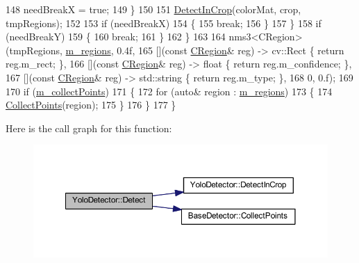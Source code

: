 \begin{DoxyCode}
148                 needBreakX = \textcolor{keyword}{true};
149             \}
150 
151             \mbox{\hyperlink{class_yolo_detector_ad3ca3f52cee36d143b015a3f5f99ebf6}{DetectInCrop}}(colorMat, crop, tmpRegions);
152 
153             \textcolor{keywordflow}{if} (needBreakX)
154             \{
155                 \textcolor{keywordflow}{break};
156             \}
157         \}
158         \textcolor{keywordflow}{if} (needBreakY)
159         \{
160             \textcolor{keywordflow}{break};
161         \}
162     \}
163 
164     nms3<CRegion>(tmpRegions, \mbox{\hyperlink{class_base_detector_a409c20093acba261db8354ca72058fce}{m\_regions}}, 0.4f,
165          [](\textcolor{keyword}{const} \mbox{\hyperlink{class_c_region}{CRegion}}& reg) -> cv::Rect \{ \textcolor{keywordflow}{return} reg.m\_rect; \},
166     [](\textcolor{keyword}{const} \mbox{\hyperlink{class_c_region}{CRegion}}& reg) -> \textcolor{keywordtype}{float} \{ \textcolor{keywordflow}{return} reg.m\_confidence; \},
167     [](\textcolor{keyword}{const} \mbox{\hyperlink{class_c_region}{CRegion}}& reg) -> std::string \{ \textcolor{keywordflow}{return} reg.m\_type; \},
168     0, 0.f);
169 
170     \textcolor{keywordflow}{if} (\mbox{\hyperlink{class_base_detector_a403cbf784fcb960bdb7d080c86c4a2ea}{m\_collectPoints}})
171     \{
172         \textcolor{keywordflow}{for} (\textcolor{keyword}{auto}& region : \mbox{\hyperlink{class_base_detector_a409c20093acba261db8354ca72058fce}{m\_regions}})
173         \{
174             \mbox{\hyperlink{class_base_detector_a20380b0980c6f262b0829f37fb89d2a7}{CollectPoints}}(region);
175         \}
176     \}
177 \}
\end{DoxyCode}
Here is the call graph for this function\+:\nopagebreak
\begin{figure}[H]
\begin{center}
\leavevmode
\includegraphics[width=350pt]{class_yolo_detector_a4c4232e3198a50666e6b4ed9d00bf42c_cgraph}
\end{center}
\end{figure}
\mbox{\label{class_yolo_detector_ad3ca3f52cee36d143b015a3f5f99ebf6}} 
